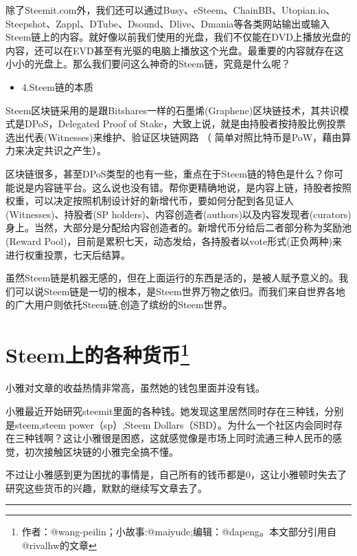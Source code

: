 \documentclass[]{ctexbook}
\providecommand{\tightlist}{%
  \setlength{\itemsep}{0pt}\setlength{\parskip}{0pt}}
\begin{document}
除了Steemit.com外，我们还可以通过Busy、eSteem、ChainBB、Utopian.io、Steepshot、Zappl、DTube、Dsound、Dlive、Dmania等各类网站输出或输入Steem链上的内容。就好像以前我们使用的光盘，我们不仅能在DVD上播放光盘的内容，还可以在EVD甚至有光驱的电脑上播放这个光盘。最重要的内容就存在这小小的光盘上。那么我们要问这么神奇的Steem链，究竟是什么呢？

\begin{itemize}
\tightlist
\item
  4.Steem链的本质
\end{itemize}

Steem区块链采用的是跟Bitshares一样的石墨烯(Graphene)区块链技术，其共识模式是DPoS，Delegated Proof of Stake，大致上说，就是由持股者按持股比例投票选出代表(Witnesses)来维护、验证区块链网路 （ 简单对照比特币是PoW，藉由算力来决定共识之产生）。

区块链很多，甚至DPoS类型的也有一些，重点在于Steem链的特色是什么？你可能说是内容链平台。这么说也没有错。帮你更精确地说，是内容上链，持股者按照权重，可以决定按照机制设计好的新增代币，要如何分配到各见证人(Witnesses)、持股者(SP holders)、内容创造者(authors)以及内容发现者(curators)身上。当然，大部分是分配给内容创造者的。新增代币分给后二者部分称为奖励池(Reward Pool)，目前是累积七天，动态发给，各持股者以vote形式(正负两种)来进行权重投票，七天后结算。

虽然Steem链是机器无感的，但在上面运行的东西是活的，是被人赋予意义的。我们可以说Steem链是一切的根本，是Steem世界万物之依归。而我们来自世界各地的广大用户则依托Steem链,创造了缤纷的Steem世界。

\hypertarget{gzhb}{%
\section[Steem上的各种货币]{\texorpdfstring{Steem上的各种货币\footnote{作者：@wang-peilin；小故事:@maiyude;编辑：@dapeng。本文部分引用自@rivalhw的文章}}{Steem上的各种货币}}\label{gzhb}}

小雅对文章的收益热情非常高，虽然她的钱包里面并没有钱。

小雅最近开始研究steemit里面的各种钱。她发现这里居然同时存在三种钱，分别是steem,steem power（sp）,Steem Dollars（SBD）。为什么一个社区内会同时存在三种钱啊？这让小雅很是困惑，这就感觉像是市场上同时流通三种人民币的感觉，初次接触区块链的小雅完全搞不懂。

不过让小雅感到更为困扰的事情是，自己所有的钱币都是0，这让小雅顿时失去了研究这些货币的兴趣，默默的继续写文章去了。

\begin{center}\rule{0.5\linewidth}{\linethickness}\end{center}
\end{document}
